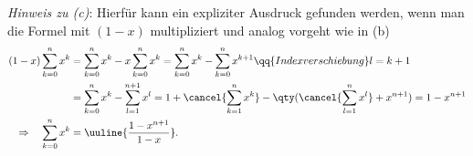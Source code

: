 \emph{Hinweis zu (c)}: Hierfür kann ein expliziter Ausdruck gefunden werden, wenn man die Formel mit $(1-x)$ multipliziert und analog vorgeht wie in (b) 
\begin{align}
        (1-x) \sum_{k=0}^n x^k &= \sum_{k=0}^n x^k - x \sum_{k=0}^n x^k = \sum_{k=0}^n x^k - \sum_{k=0}^n x^{k+1} \qq{Indexverschiebung} l = k+1 \\
        &= \sum_{k=0}^n x^k - \sum_{l=1}^{n+1} x^l = 1 + \cancel{\sum_{k=1}^n x^k} - \qty(\cancel{\sum_{l=1}^n x^l} + x^{n+1}) = 1 - x^{n+1} \\
        \Rightarrow \quad \sum_{k=0}^n x^k &= \uuline{\frac{1 - x^{n+1}}{1-x}}.
\end{align}